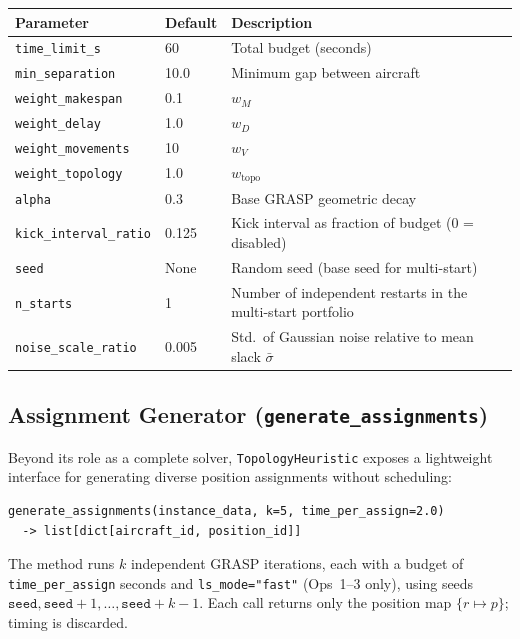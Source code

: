 \begin{center}
\begin{tabular}{lll}
\toprule
Parameter & Default & Description \\
\midrule
\texttt{time\_limit\_s}    & 60   & Total budget (seconds) \\
\texttt{min\_separation}   & 10.0 & Minimum gap between aircraft \\
\texttt{weight\_makespan}  & 0.1  & $w_M$ \\
\texttt{weight\_delay}     & 1.0  & $w_D$ \\
\texttt{weight\_movements} & 10   & $w_V$ \\
\texttt{weight\_topology}    & 1.0   & $w_{\text{topo}}$ \\
\texttt{alpha}               & 0.3   & Base GRASP geometric decay \\
\texttt{kick\_interval\_ratio} & 0.125 & Kick interval as fraction of budget (0 = disabled) \\
\texttt{seed}                & None  & Random seed (base seed for multi-start) \\
\texttt{n\_starts}           & 1     & Number of independent restarts in the multi-start portfolio \\
\texttt{noise\_scale\_ratio} & 0.005 & Std.\ of Gaussian noise relative to mean slack $\bar{\sigma}$ \\
\bottomrule
\end{tabular}
\end{center}

\subsection{Assignment Generator (\texttt{generate\_assignments})}
\label{sec:topo-generate-assignments}

Beyond its role as a complete solver, \texttt{TopologyHeuristic} exposes a
lightweight interface for generating diverse position assignments without
scheduling:

\begin{verbatim}
generate_assignments(instance_data, k=5, time_per_assign=2.0)
  -> list[dict[aircraft_id, position_id]]
\end{verbatim}

The method runs $k$ independent GRASP iterations, each with a budget of
\texttt{time\_per\_assign} seconds and \texttt{ls\_mode="fast"} (Ops~1–3
only), using seeds $\texttt{seed}, \texttt{seed}+1, \ldots, \texttt{seed}+k-1$.
Each call returns only the position map $\{r \mapsto p\}$; timing is discarded.

